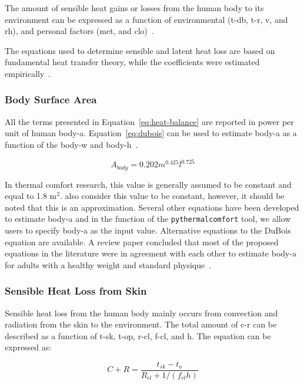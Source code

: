 The amount of sensible heat gains or losses from the human body to its environment can be expressed as a function of environmental (\ac{t-db}, \ac{t-r}, \ac{v}, and \ac{rh}), and personal factors (\ac{met}, and \ac{clo})~\cite{ASHRA2017}.

The equations used to determine sensible and latent heat loss are based on fundamental heat transfer theory, while the coefficients were estimated empirically~\cite{ASHRA2017}.

\subsubsection{Body Surface Area}

All the terms presented in Equation~\ref{eq:heat-balance} are reported in power per unit of human \ac{body-a}.
Equation~\ref{eq:dubois} can be used to estimate \ac{body-a} as a function of the \ac{body-w} and \ac{body-h}~\cite{DuBois}.

\begin{equation}
    A_{body} = 0.202 m^{0.425} l^{0.725}\label{eq:dubois}
\end{equation}

In thermal comfort research, this value is generally assumed to be constant and equal to 1.8 m$^{2}$.
 also consider this value to be constant, however, it should be noted that this is an approximation.
Several other equations have been developed to estimate \ac{body-a} and in the function of the \verb|pythermalcomfort| tool, we allow users to specify \ac{body-a} as the input value.
Alternative equations to the DuBois equation are available.
A review paper concluded that most of the proposed equations in the literature were in agreement with each other to estimate \ac{body-a} for adults with a healthy weight and standard physique~\cite{Redlarski2016}.

\subsubsection{Sensible Heat Loss from Skin}

Sensible heat loss from the human body mainly occurs from convection and radiation from the skin to the environment.
The total amount of \ac{c-r} can be described as a function of \ac{t-sk}, \ac{t-op}, \ac{r-cl}, \ac{f-cl}, and \ac{h}.
The equation can be expressed as:

\begin{equation}
    C+R=\frac{t_{s k}-t_{o}}{R_{c l}+1 /\left(f_{c l} h\right)}\label{eq:c-r}
\end{equation}

